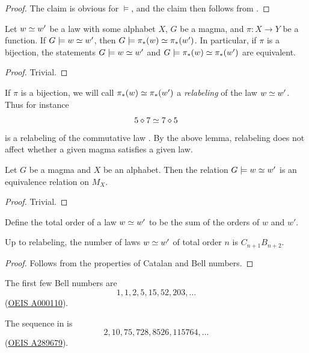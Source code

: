 \begin{proof}
  The claim is obvious for $\models$, and the claim then follows from .
\end{proof}

\begin{lemma}[Pushforward]\label{push}
  Let $w \simeq w'$ be a law with some alphabet $X$, $G$ be a magma, and $\pi: X \to Y$ be a function.
  If $G \models w \simeq w'$, then $G \models \pi_*(w) \simeq \pi_*(w')$.
  In particular, if $\pi$ is a bijection, the statements $G \models w \simeq w'$ and $G \models \pi_*(w) \simeq \pi_*(w')$ are equivalent.
\end{lemma}

\begin{proof}
  Trivial.
\end{proof}

If $\pi$ is a bijection, we will call $\pi_*(w) \simeq \pi_*(w')$ a \emph{relabeling} of the law $w \simeq w'$. Thus for instance
$$ 5 \diamond 7 \simeq 7 \diamond 5$$
is a relabeling of the commutative law . By the above lemma, relabeling does not affect whether a given magma satisfies a given law.

\begin{lemma}[Equivalence]\label{equiv}
  Let $G$ be a magma and $X$ be an alphabet.
  Then the relation $G \models w \simeq w'$ is an equivalence relation on $M_X$.
\end{lemma}

\begin{proof}
  Trivial.
\end{proof}

Define the total order of a law $w \simeq w'$ to be the sum of the orders of $w$ and $w'$.

\begin{lemma}\label{law-count}
  Up to relabeling, the number of laws $w \simeq w'$ of total order $n$ is $C_{n+1} B_{n+2}$.
\end{lemma}

\begin{proof}
  Follows from the properties of Catalan and Bell numbers.
\end{proof}

The first few Bell numbers are
$$ 1, 1, 2, 5, 15, 52, 203, \dots$$
(\href{https://oeis.org/A000110}{OEIS A000110}).

The sequence in  is
$$ 2, 10, 75, 728, 8526, 115764, \dots$$
(\href{https://oeis.org/A289679}{OEIS A289679}).

